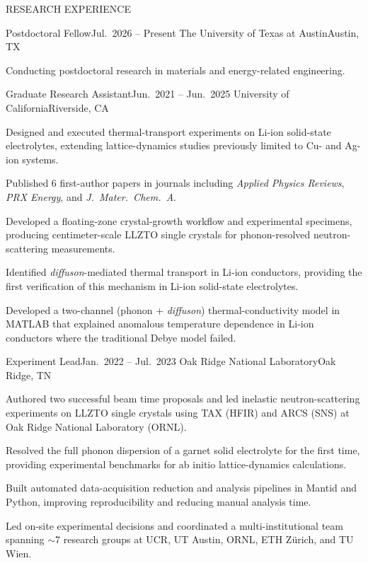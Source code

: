 \documentclass{resume} %
\begin{document}

\begin{rSection}{RESEARCH EXPERIENCE}

\begin{rSubsection}
{Postdoctoral Fellow}{Jul.\ 2026 -- Present}
{The University of Texas at Austin}{Austin, TX}
\item Conducting postdoctoral research in materials and energy-related engineering.
\end{rSubsection}

\begin{rSubsection}
{Graduate Research Assistant}{Jun.\ 2021 -- Jun.\ 2025}
{University of California}{Riverside, CA}
\item Designed and executed thermal-transport experiments on Li-ion solid-state electrolytes, extending lattice-dynamics studies previously limited to Cu- and Ag-ion systems.
\item Published 6 first-author papers in journals including \textit{Applied Physics Reviews}, \textit{PRX Energy}, and \textit{J.\ Mater.\ Chem.\ A}.
\item Developed a floating-zone crystal-growth workflow and experimental specimens, producing centimeter-scale LLZTO single crystals for phonon-resolved neutron-scattering measurements.
\item Identified \textit{diffuson}-mediated thermal transport in Li-ion conductors, providing the first verification of this mechanism in Li-ion solid-state electrolytes.
\item Developed a two-channel (phonon + \textit{diffuson}) thermal-conductivity model in MATLAB that explained anomalous temperature dependence in Li-ion conductors where the traditional Debye model failed.
\end{rSubsection}

\begin{rSubsection}
{Experiment Lead}{Jan.\ 2022 -- Jul.\ 2023}
{Oak Ridge National Laboratory}{Oak Ridge, TN}
\item Authored two successful beam time proposals and led inelastic neutron-scattering experiments on LLZTO single crystals using TAX (HFIR) and ARCS (SNS) at Oak Ridge National Laboratory (ORNL).
\item Resolved the full phonon dispersion of a garnet solid electrolyte for the first time, providing experimental benchmarks for ab initio lattice-dynamics calculations.
\item Built automated data-acquisition reduction and analysis pipelines in Mantid and Python, improving reproducibility and reducing manual analysis time.
\item Led on-site experimental decisions and coordinated a multi-institutional team spanning $\sim$7 research groups at UCR, UT Austin, ORNL, ETH Z\"{u}rich, and TU Wien.
\end{rSubsection}


\end{rSection}
\end{document}

